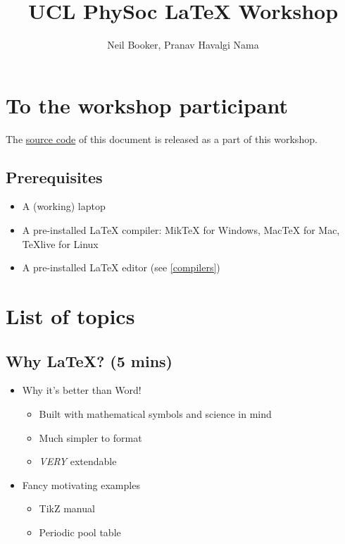 \documentclass[a4paper]{article}
\begin{document}
\title{UCL PhySoc {\LaTeX} Workshop}
\author{Neil Booker, Pranav Havalgi Nama}
\maketitle
\tableofcontents

\section{To the workshop participant}

The \href{https://github.com/PranavHN/LaTeX-workshop}{source code} of this document is released as a part of this workshop.

\subsection{Prerequisites}

\begin{itemize}
	\item A (working) laptop
	\item A pre-installed {\LaTeX} compiler: MikTeX for Windows, MacTeX for Mac, TeXlive for Linux
	\item A pre-installed {\LaTeX} editor (see \ref{compilers})
\end{itemize}

\section{List of topics}

\subsection{Why {\LaTeX}? (5 mins)}

\begin{itemize}
	\item Why it's better than Word!
	\begin{itemize}
		\item Built with mathematical symbols and science in mind
		\item Much simpler to format
		\item \textit{VERY} extendable
	\end{itemize}
	
	\item Fancy motivating examples
	\begin{itemize}
		\item TikZ manual
		\item Periodic pool table \cite{PeriodicPoolTable}
	\end{itemize}
\end{itemize}
\end{document}
